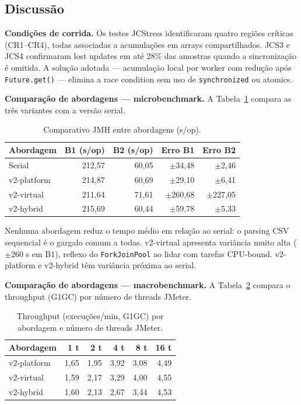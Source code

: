 \subsection{Discussão}

\textbf{Condições de corrida.}
Os testes JCStress identificaram quatro regiões críticas (CR1--CR4), todas
associadas a acumulações em arrays compartilhados. JCS3 e JCS4 confirmaram
lost updates em até 28\% das amostras quando a sincronização é omitida. A
solução adotada --- acumulação local por worker com redução após
\texttt{Future.get()} --- elimina a race condition sem uso de
\texttt{synchronized} ou atomics.

\textbf{Comparação de abordagens --- microbenchmark.}
A Tabela~\ref{tab:jmh-comparativo} compara as três variantes com a versão serial.

\begin{table}[H]
\centering
\begin{tabular}{lrrrr}
\hline
\textbf{Abordagem} & \textbf{B1 (s/op)} & \textbf{B2 (s/op)} & \textbf{Erro B1} & \textbf{Erro B2} \\
\hline
Serial      & 212{,}57 & 60{,}05 &  $\pm$34{,}48 &  $\pm$2{,}46 \\
v2-platform & 214{,}87 & 60{,}69 &  $\pm$29{,}10 &  $\pm$6{,}41 \\
v2-virtual  & 211{,}64 & 71{,}61 & $\pm$260{,}68 & $\pm$227{,}05 \\
v2-hybrid   & 215{,}69 & 60{,}44 &  $\pm$59{,}78 &  $\pm$5{,}33 \\
\hline
\end{tabular}
\caption{Comparativo JMH entre abordagens (s/op).}
\label{tab:jmh-comparativo}
\end{table}

Nenhuma abordagem reduz o tempo médio em relação ao serial: o parsing CSV
sequencial é o gargalo comum a todas. v2-virtual apresenta variância muito
alta ($\pm$260 s em B1), reflexo do \texttt{ForkJoinPool} ao lidar com tarefas
CPU-bound. v2-platform e v2-hybrid têm variância próxima ao serial.

\textbf{Comparação de abordagens --- macrobenchmark.}
A Tabela~\ref{tab:jmeter-comparativo} compara o throughput (G1GC) por número
de threads JMeter.

\begin{table}[H]
\centering
\begin{tabular}{lrrrrr}
\hline
\textbf{Abordagem} & \textbf{1 t} & \textbf{2 t} & \textbf{4 t} & \textbf{8 t} & \textbf{16 t} \\
\hline
v2-platform & 1{,}65 & 1{,}95 & 3{,}92 & 3{,}08 & 4{,}49 \\
v2-virtual  & 1{,}59 & 2{,}17 & 3{,}29 & 4{,}00 & 4{,}55 \\
v2-hybrid   & 1{,}60 & 2{,}13 & 2{,}67 & 3{,}44 & 4{,}53 \\
\hline
\end{tabular}
\caption{Throughput (execuções/min, G1GC) por abordagem e número de threads JMeter.}
\label{tab:jmeter-comparativo}
\end{table}

